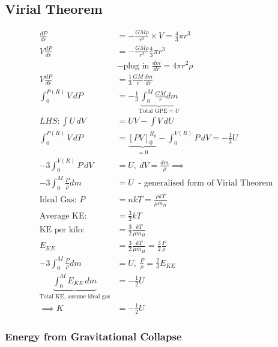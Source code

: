\documentclass[a4paper,11pt,normalem]{article}
\begin{document}
\section{}
\subsection{Virial Theorem}

\begin{align*}
    \frac{dP}{dr} &= -\frac{GM\rho}{r^2} \times V = \frac{4}{3}\pi r^3 \\
    V\frac{dP}{dr} &= -\frac{GM\rho}{r^2}\frac{4}{3}\pi r^3 \\
                   &- \text{plug in }\frac{dm}{dr} = 4\pi r^2 \rho \\
    V\frac{dP}{dr} &= \frac{1}{3}\frac{GM}{r}\frac{dm}{dr} \\
    \int_{0}^{P(R)} V\,dP &= -\frac{1}{3} \underbrace{\int_{0}^{M} \frac{GM}{r}dm}_{\text{Total GPE} = U} \\
    LHS: \int U\,dV &= UV - \int V\,dU \\
    \int_{0}^{P(R)} V\,dP &= \underbrace{[PV]_{0}^{R_{0}}}_{= 0} - \int_{0}^{V(R)} P\,dV = -\frac{1}{3} U \\
    -3 \int_{0}^{V(R)} P\,dV &= U, ~ dV = \frac{dm}{\rho} \implies \\
    -3 \int_{0}^{M} \frac{P}{\rho} dm &= U ~ \text{ - generalised form of Virial Theorem} \\
    \text{Ideal Gas: } P &= nkT = \frac{\rho kT}{\mu m_{H}} \\
    \text{Average KE: } &= \frac{3}{2}kT \\
    \text{KE per kilo: } &= \frac{3}{2} \frac{kT}{\mu m_{H}} \\
    E_{KE} &= \frac{3}{2} \frac{kT}{\mu m_{H}} = \frac{3}{2}\frac{P}{\rho} \\
    -3 \int_{0}^{M}\frac{P}{\rho}dm &= U,~ \frac{P}{\rho} = \frac{2}{3}E_{KE} \\
    \underbrace{\int_{0}^{M} E_{KE} \,dm}_{\text{Total KE, assume ideal gas}} &= -\frac{1}{2} U \\
    \implies K &= -\frac{1}{2}U
\end{align*}

\subsubsection{Energy from Gravitational Collapse}
\end{document}
